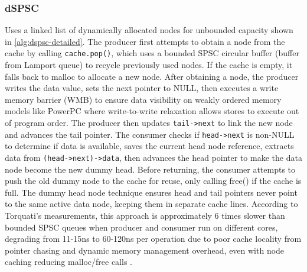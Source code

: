 \subsubsection{\acf{dSPSC}}
Uses a linked list of dynamically allocated nodes for unbounded capacity shown in \cref{alg:dspsc-detailed}. The producer first attempts to obtain a node from the cache by calling \texttt{cache.pop()}, which uses a bounded SPSC circular buffer (buffer from Lamport queue) to recycle previously used nodes. If the cache is empty, it falls back to malloc to allocate a new node. After obtaining a node, the producer writes the data value, sets the next pointer to NULL, then executes a write memory barrier (WMB) to ensure data visibility on weakly ordered memory models like PowerPC where write-to-write relaxation allows stores to execute out of program order. The producer then updates \texttt{tail->next} to link the new node and advances the tail pointer. The consumer checks if \texttt{head->next} is non-NULL to determine if data is available, saves the current head node reference, extracts data from \texttt{(head->next)->data}, then advances the head pointer to make the data node become the new dummy head. Before returning, the consumer attempts to push the old dummy node to the cache for reuse, only calling free() if the cache is full. The dummy head node technique ensures head and tail pointers never point to the same active data node, keeping them in separate cache lines. According to Torquati's measurements, this approach is approximately 6 times slower than bounded SPSC queues when producer and consumer run on different cores, degrading from 11-15ns to 60-120ns per operation due to poor cache locality from pointer chasing and dynamic memory management overhead, even with node caching reducing malloc/free calls \cite{torquati2010singleproducersingleconsumerqueuessharedcache}.

